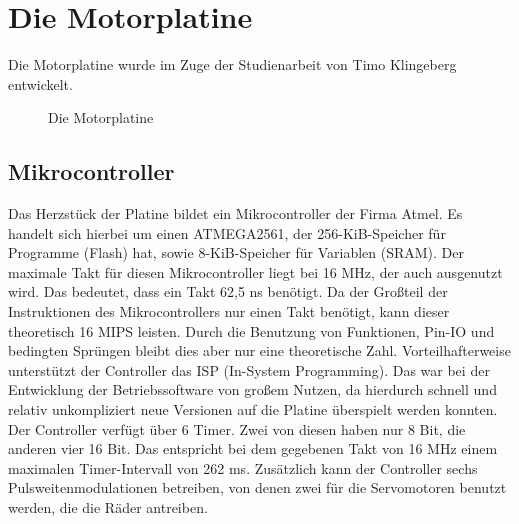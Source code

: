 \section{Die Motorplatine}
Die Motorplatine wurde im Zuge der Studienarbeit von Timo Klingeberg \cite{STUD_TIMO}
entwickelt.
\begin{figure}[htb]
 \centering
 \caption{\label{board}Die Motorplatine}
\end{figure}
\subsection{Mikrocontroller}
Das Herzstück der Platine bildet ein Mikrocontroller der Firma Atmel.
Es handelt sich hierbei um einen ATMEGA2561\cite{ATMEGA_MANUAL}, der 256-KiB-Speicher für
Programme (Flash) hat, sowie 8-KiB-Speicher für Variablen (SRAM). Der maximale Takt für
diesen Mikrocontroller liegt bei 16 MHz, der auch ausgenutzt wird. Das bedeutet, dass
ein Takt 62,5 ns benötigt. Da der Großteil der Instruktionen des Mikrocontrollers nur
einen Takt benötigt, kann dieser theoretisch 16 MIPS leisten. Durch die Benutzung
von Funktionen, Pin-IO und bedingten Sprüngen bleibt dies aber nur eine theoretische Zahl.
Vorteilhafterweise unterstützt der Controller das ISP (In-System Programming). Das war bei der
Entwicklung der Betriebssoftware von großem Nutzen, da hierdurch schnell und relativ
unkompliziert neue Versionen auf die Platine überspielt werden konnten.\\
Der Controller verfügt über 6 Timer. Zwei von diesen haben nur 8 Bit, die anderen vier
16 Bit. Das entspricht bei dem gegebenen Takt von 16 MHz einem maximalen Timer-Intervall von 262 ms.
Zusätzlich kann der Controller sechs Pulsweitenmodulationen betreiben, von
denen zwei für die Servomotoren benutzt werden, die die Räder antreiben.
